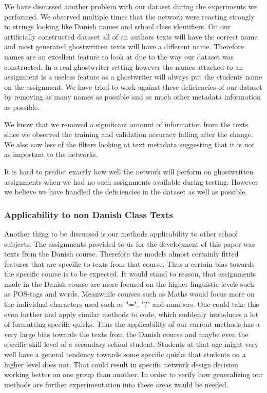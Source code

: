 We have discussed another problem with our dataset during the experiments we
performed. We observed multiple times that the network were reacting strongly
to strings looking like Danish names and school class identifiers. On our
artificially constructed dataset all of an authors texts will have the correct
name and most generated ghostwritten texts will have a different name.
Therefore names are an excellent feature to look at due to the way our dataset
was constructed. In a real ghostwriter setting however the names attached to an
assignment is a useless feature as a ghostwriter will always put the students
name on the assignment. We have tried to work against these deficiencies of
our dataset by removing as many names as possible and as much other metadata
information as possible.

We know that we removed a significant amount of information from the texts since
we observed the training and validation accuracy falling after the change. We
also saw less of the filters looking at text metadata suggesting that it is not
as important to the networks.

It is hard to predict exactly how well the network will perform on ghostwritten
assignments when we had no such assignments available during testing. However we
believe we have handled the deficiencies in the dataset as well as possible.


\subsubsection{Applicability to non Danish Class Texts}

Another thing to be discussed is our methods applicability to other school
subjects. The assignments provided to us for the development of this paper was
texts from the Danish course. Therefore the models almost certainly fitted
features that are specific to texts from that course. Thus a certain bias
towards the specific course is to be expected. It would stand to reason, that
assignments made in the Danish course are more focused on the higher linguistic
levels such as \gls{POS}-tags and words. Meanwhile courses such as Maths would
focus more on the individual characters used such as "=", "?" and numbers. One
could take this even further and apply similar methods to code, which suddenly
introduces a lot of formatting specific quirks. Thus the applicability of our
current methods has a very large bias towards the texts from the Danish course
and maybe even the specific skill level of a secondary school student. Students
at that age might very well have a general tendency towards some specific quirks
that students on a higher level does not. That could result in specific network
design decision working better on one group than another. In order to verify how
generalizing our methods are further experimentation into these areas would be
needed.

